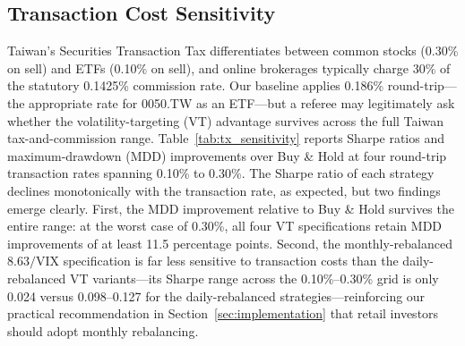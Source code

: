 %

\subsection{Transaction Cost Sensitivity}\label{sec:tx_sensitivity}

Taiwan's Securities Transaction Tax differentiates between common stocks (0.30\% on
sell) and ETFs (0.10\% on sell), and online brokerages typically charge 30\% of the
statutory 0.1425\% commission rate. Our baseline applies 0.186\% round-trip---the
appropriate rate for 0050.TW as an ETF---but a referee may legitimately ask whether
the volatility-targeting (VT) advantage survives across the full Taiwan tax-and-commission
range. Table~\ref{tab:tx_sensitivity} reports Sharpe ratios and maximum-drawdown (MDD)
improvements over Buy \& Hold at four round-trip transaction rates spanning 0.10\% to
0.30\%. The Sharpe ratio of each strategy declines monotonically with the transaction
rate, as expected, but two findings emerge clearly. First, the MDD improvement
relative to Buy \& Hold survives the entire range: at the worst case of 0.30\%, all
four VT specifications retain MDD improvements of at least 11.5 percentage points.
Second, the monthly-rebalanced $8.63/\text{VIX}$ specification is far less sensitive to
transaction costs than the daily-rebalanced VT variants---its Sharpe range across the
0.10\%--0.30\% grid is only 0.024 versus 0.098--0.127 for the daily-rebalanced
strategies---reinforcing our practical recommendation in Section~\ref{sec:implementation}
that retail investors should adopt monthly rebalancing.

